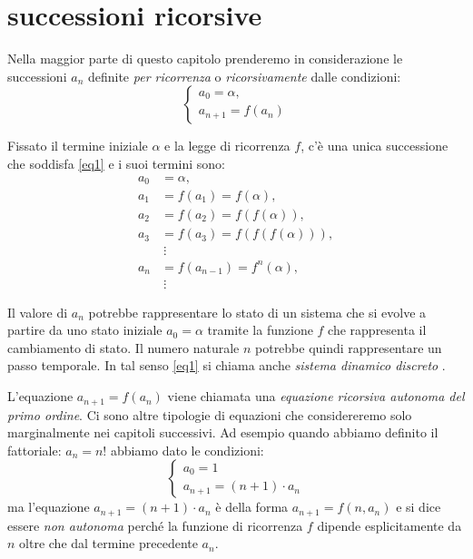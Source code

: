 \chapter{successioni ricorsive}
\label{ch:successioni_ricorsive}

Nella maggior parte di questo capitolo prenderemo in considerazione le successioni $a_n$
definite \emph{per ricorrenza} o \emph{ricorsivamente} dalle condizioni:
\begin{equation}\label{eq1}
\begin{cases}
  a_0 = \alpha,\\
  a_{n+1} = f(a_n)
\end{cases}
\end{equation}

Fissato il termine iniziale $\alpha$ e la legge di ricorrenza $f$,
c'è una unica successione che soddisfa \eqref{eq1} e i suoi termini
sono:
\begin{align*}
a_0 & =\alpha,\\
a_1 &= f(a_1)=f(\alpha),\\
a_2 &= f(a_2)=f(f(\alpha)),\\
a_3 &= f(a_3)=f(f(f(\alpha))),\\
&\ \vdots\\
a_n &= f(a_{n-1}) = f^n(\alpha),\\
&\ \vdots
\end{align*}


Il valore di $a_n$ potrebbe rappresentare lo stato di un sistema che
si evolve a partire da uno stato iniziale $a_0=\alpha$ tramite la
funzione $f$ che rappresenta il cambiamento di stato.
Il numero naturale $n$ potrebbe quindi rappresentare un passo temporale.
In tal senso \eqref{eq1} si chiama anche \emph{sistema dinamico discreto}%
.

L'equazione $a_{n+1} = f(a_n)$ viene chiamata una \emph{equazione ricorsiva autonoma del primo ordine}.
Ci sono altre tipologie di equazioni che considereremo
solo marginalmente nei capitoli successivi.
Ad esempio quando abbiamo definito
il fattoriale: $a_n = n!$ abbiamo dato le condizioni:
\[
\begin{cases}
  a_0 = 1\\
  a_{n+1} = (n+1) \cdot a_n
\end{cases}
\]
ma l'equazione $a_{n+1} = (n+1) \cdot a_n$ è della forma $a_{n+1} =
f(n, a_n)$ e si dice essere \emph{non autonoma} perché la funzione di
ricorrenza $f$ dipende esplicitamente da $n$ oltre che dal termine
precedente $a_n$.

